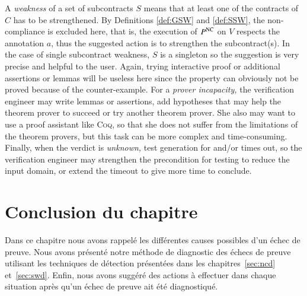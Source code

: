 A \emph{weakness} of a set of subcontracts $S$ means that at least one of the contracts of $C$
has to be strengthened. By Definitions \ref{def:GSW} and \ref{def:SSW}, the non-compliance is excluded here, 
that is, the execution of $P^{\mathrm{NC}}$ on  $V$  respects the annotation $a$, thus
the suggested action is to strengthen the subcontract(s).
In the case of single subcontract weakness, $S$ is a singleton so the suggestion
is very precise and helpful to the user.
Again, trying interactive proof or additional assertions or lemmas 
will be useless here since the property can obviously not be proved 
because of the counter-example.
For a \emph{prover incapacity,} the verification engineer
may write lemmas or assertions, add hypotheses that may help the theorem prover to
succeed or try another theorem prover.
She also may want to use a proof assistant like \textsc{Coq}, so that she does
not suffer from the limitations of the theorem provers, but 
this task can be more complex and time-consuming.
Finally, when the verdict is \emph{unknown,} test generation for \NCD and/or \SWD times out, 
so the verification engineer may strengthen the
precondition for testing to reduce the input domain, or extend the timeout to
give \stady more time to conclude.


\section*{Conclusion du chapitre}


Dans ce chapitre nous avons rappelé les différentes causes possibles d'un échec
de preuve.
Nous avons présenté notre méthode de diagnostic des échecs de
preuve utilisant les techniques de détection présentées dans les
chapitres~\ref{sec:ncd} et~\ref{sec:swd}.
Enfin, nous avons suggéré des actions à effectuer dans chaque situation après
qu'un échec de preuve ait été diagnostiqué.
